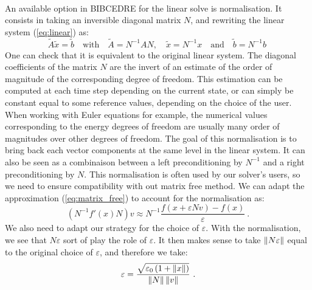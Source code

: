 
      \paragraph{}
      An available option in BIBCEDRE for the linear solve is normalisation.
      It consists in taking an inversible diagonal matrix $N$, and rewriting the linear system (\ref{eq:linear}) as:
      \begin{equation}
        \tilde{A}\tilde{x} = \tilde{b}
        \quad\textrm{with}\quad \tilde{A} = N^{-1} A N,
        \quad \tilde{x} = N^{-1} x
        \quad\textrm{and}\quad \tilde{b} = N^{-1} b \
      \end{equation}
      One can check that it is equivalent to the original linear system.
      The diagonal coefficients of the matrix $N$ are the invert of an estimate of the order of magnitude of the corresponding degree of freedom. 
      This estimation can be computed at each time step depending on the current state, or can simply be constant equal to some reference values, depending on the choice of the user.
      When working with Euler equations for example, the numerical values corresponding to the energy degrees of freedom are usually many order of magnitudes over other degrees of freedom.
      The goal of this normalisation is to bring back each vector components at the same level in the linear system.
      It can also be seen as a combinaison between a left preconditioning by $N^{-1}$ and a right preconditioning by $N$.
      This normalisation is often used by our solver's users, so we need to ensure compatibility with out matrix free method.
      We can adapt the approximation (\ref{eq:matrix_free}) to account for the normalisation as:
      \begin{equation}
        \left( N^{-1} f'\left(x\right) N \right) v \approx N^{-1} \frac{f\left(x + \varepsilon N v\right) - f\left(x\right)}{\varepsilon} \ .
      \end{equation}
      We also need to adapt our strategy for the choice of $\varepsilon$.
      With the normalisation, we see that $N \varepsilon$ sort of play the role of $\varepsilon$.
      It then makes sense to take $\norm{N \varepsilon}$ equal to the original choice of $\varepsilon$, and therefore we take:
      \begin{equation}
        \varepsilon = \frac{\sqrt{\varepsilon_0 \left(1 + \norm{x}\right) }}{\norm{N} \norm{v}} \ .
      \end{equation}
